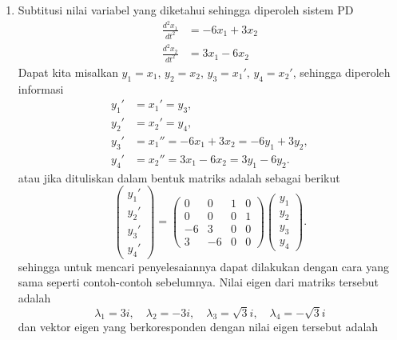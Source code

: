 \documentclass[a4paper]{article}
\theoremstyle{definisi}
\numberwithin{equation}{section}
\begin{document}
\begin{enumerate}
    \item Subtitusi nilai variabel yang diketahui sehingga diperoleh sistem PD
    \begin{align*}
        \frac{d^2x_1}{dt^2}&=-6x_1+3x_2\\
        \frac{d^2x_2}{dt^2}&=3x_1-6x_2
    \end{align*}
    Dapat kita misalkan $y_1=x_1,\,y_2=x_2,\,y_3=x_1',\,y_4=x_2'$, sehingga diperoleh informasi
    \begin{align*}
        y_1'&=x_1'=y_3,\\
        y_2'&=x_2'=y_4,\\
        y_3'&=x_1''=-6x_1+3x_2=-6y_1+3y_2,\\
        y_4'&=x_2''=3x_1-6x_2=3y_1-6y_2.
    \end{align*}
    atau jika dituliskan dalam bentuk matriks adalah sebagai berikut
    \begin{equation*}
        \begin{pmatrix}
            y_1'\\
            y_2'\\
            y_3'\\
            y_4'
        \end{pmatrix}=\begin{pmatrix}
            0 & 0 & 1 & 0\\
            0 & 0 & 0 & 1\\
            -6 & 3 & 0 & 0\\
            3 & -6 & 0 & 0
        \end{pmatrix}\begin{pmatrix}
            y_1\\
            y_2\\
            y_3\\
            y_4
        \end{pmatrix}.
    \end{equation*}
    sehingga untuk mencari penyelesaiannya dapat dilakukan dengan cara yang sama seperti contoh-contoh sebelumnya. Nilai eigen dari matriks tersebut adalah
    \[\lambda_1 = 3i, \quad \lambda_2 = -3i, \quad \lambda_3 = \sqrt{3}i, \quad \lambda_4 = -\sqrt{3}i\]
    dan vektor eigen yang berkoresponden dengan nilai eigen tersebut adalah

\end{enumerate}
\end{document}

